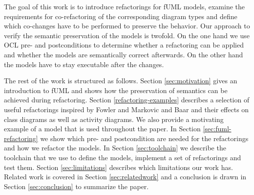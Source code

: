 \documentclass{llncs}
\begin{document}

The goal of this work is to introduce refactorings for fUML models, examine the requirements for co-refactoring of the
corresponding diagram types and define which co-changes have to be performed to preserve the behavior. Our approach to
verify
the semantic preservation of the models is twofold. On the one hand we use OCL pre- and postconditions
\cite{rob99} to determine whether a refactoring can be applied and whether the models are semantically correct afterwards.
On the other hand the models have to stay executable after the changes.



The rest of the work is structured as follows. Section \ref{sec:motivation} gives an introduction to fUML and shows how 
the preservation of semantics can be achieved during refactoring. 
Section \ref{refactoring-examples} describes a selection of useful refactorings inspired by Fowler \cite{fow99} and 
Markovic and Baar \cite{DBLP:journals/sosym/MarkovicB08} and their effects on class diagrams as
well as activity diagrams. We also provide a motivating example of a model that is used throughout the paper. In Section 
\ref{sec:fuml-refactoring} we show which pre- and postcondition are needed for the refactorings and
how we refactor the models. In Section \ref{sec:toolchain} we describe the toolchain that we use to define the models, 
implement a set of refactorings and test them. Section \ref{sec:limitations} describes which limitations our work has. 
Related work is covered in Section \ref{sec:relatedwork} and a conclusion is drawn in 
Section \ref{sec:conclusion} to summarize the paper.


\end{document}
